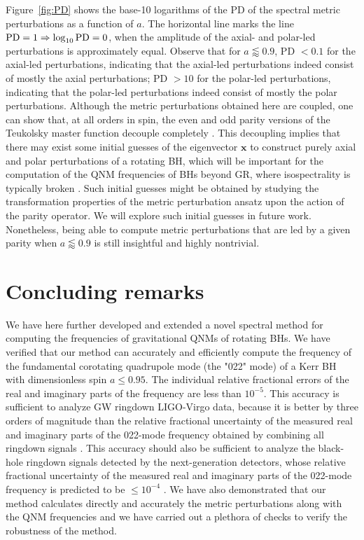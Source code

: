 \documentclass[aps,prx,amsmath,floats,floatfix,twocolumn,
  superscriptaddress,nofootinbib,showpacs]{revtex4-1}
\begin{document}
Figure~\ref{fig:PD} shows the base-10 logarithms of the PD of the spectral metric perturbations as a function of $a$. 
The horizontal line marks the line $\rm PD = 1 \Rightarrow \log_{10} PD = 0 $, when the amplitude of the axial- and polar-led perturbations is approximately equal. 
Observe that for $a \lessapprox 0.9$, PD $ < 0.1 $ for the axial-led perturbations, indicating that the axial-led perturbations indeed consist of mostly the axial perturbations; PD $ > 10 $ for the polar-led perturbations, indicating that the polar-led perturbations indeed consist of mostly the polar perturbations. 
Although the metric perturbations obtained here are coupled, one can show that, at all orders in spin, the even and odd parity versions of the Teukolsky master function decouple completely \cite{Li:Preparation}.
This decoupling implies that there may exist some initial guesses of the eigenvector $\textbf{x}$ to construct purely axial and polar perturbations of a rotating BH, which will be important for the computation of the QNM frequencies of BHs beyond GR, where isospectrality is typically broken \cite{Wagle:2021tam, QNM_dCS_02, QNM_dCS_03, QNM_dCS_04, QNM_EdGB_01, QNM_EdGB_02, QNM_EdGB_03}. 
Such initial guesses might be obtained by studying the transformation properties of the metric perturbation ansatz upon the action of the parity operator. 
We will explore such initial guesses in future work. 
Nonetheless, being able to compute metric perturbations that are led by a given parity when $a \lessapprox 0.9$ is still insightful and highly nontrivial.

\section{Concluding remarks}
\label{sec:conclusion}

We have here further developed and extended a novel spectral method for computing the frequencies of gravitational QNMs of rotating BHs. We have verified that our method can accurately and efficiently compute the frequency of the fundamental corotating quadrupole mode (the "022" mode) of a Kerr BH with dimensionless spin $a \leq 0.95$. 
The individual relative fractional errors of the real and imaginary parts of the frequency are less than $10^{-5}$. 
This accuracy is sufficient to analyze GW ringdown LIGO-Virgo data, because it is better by three orders of magnitude than the relative fractional uncertainty of the measured real and imaginary parts of the 022-mode frequency obtained by combining all ringdown signals \cite{LIGOScientific:2021sio}.
This accuracy should also be sufficient to analyze the black-hole ringdown signals detected by the next-generation detectors, whose relative fractional uncertainty of the measured real and imaginary parts of the 022-mode frequency is predicted to be $\leq 10^{-4}$ \cite{Maselli:2023khq}.
We have also demonstrated that our method calculates directly and accurately the metric perturbations along with the QNM frequencies and we have carried out a plethora of checks to verify the robustness of the method. 
\end{document}
